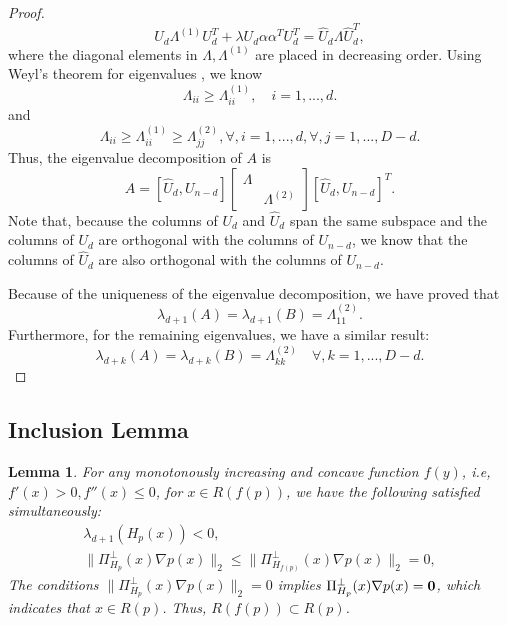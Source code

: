 \documentclass[aos,preprint]{imsart}
\newtheorem{lemma}[theorem]{Lemma}
\theoremstyle{remark}
\begin{document}
\begin{appendix}
\begin{proof}
\[
U_d\Lambda^{(1)} U_d^T+\lambda U_d \alpha \alpha^T U_d^T = \hat{U}_d {\Lambda} \hat{U}_d^T,
\]
where the diagonal elements in $\Lambda, \Lambda^{(1)}$ are placed in decreasing order. Using Weyl's theorem for eigenvalues \cite{horn2012matrix}, we know 
\[
{\Lambda}_{ii}\geq {\Lambda}_{ii}^{(1)}, \quad i=1,..., d.
\] 
and
\[
{\Lambda}_{ii}\geq {\Lambda}_{ii}^{(1)}\geq {\Lambda}_{jj}^{(2)},  \forall, i=1,..., d, \forall, j= 1,...,D-d.
\] 
Thus, the eigenvalue decomposition of $A$ is
\[
A = [\hat{U}_d, U_{n-d}] 
\left[
\begin{array}{cc}
\Lambda & \\
 & \Lambda^{(2)}
\end{array}
\right]
[\hat{U}_d, U_{n-d}]^T.
\]
Note that, because the columns of $U_d$ and $\hat{U}_d$ span the same subspace and the columns of $U_d$ are orthogonal with the columns of $U_{n-d}$, we know that the columns of $\hat{U}_d$ are also orthogonal with the columns of $U_{n-d}$.

Because of the uniqueness of the eigenvalue decomposition, we have proved that 
\[
\lambda_{d+1}(A) = \lambda_{d+1}(B) = \Lambda^{(2)}_{1 1}.
\]
Furthermore, for the remaining eigenvalues, we have a similar result:
\[
\lambda_{d+k}(A) = \lambda_{d+k}(B) = \Lambda^{(2)}_{k k}\quad \forall, k = 1,...,D-d.
\]
\end{proof}
%
\subsection{Inclusion Lemma}
\begin{lemma}{
For any monotonously increasing and concave function $f(y)$, i.e,  $f'(x)>0, f''(x) \leq 0$, for $x\in R({f(p)})$, we have the following satisfied simultaneously:
 \begin{gather*}
 \lambda_{d+1}(H_p(x)) < 0,\\
\|\Pi_{H_p}^\perp(x)\nabla p(x)\|_2 \leq \|\Pi_{H_{f(p)}}^{\perp}(x)\nabla p(x)\|_2=0,
\end{gather*}
The conditions $\|\Pi_{H_p}^\perp(x)\nabla p(x)\|_2  =0$ implies $\Pi_{H_p}^\perp(x)\nabla p(x)=\bf 0$, which indicates that $x\in R(p)$. Thus, $R(f(p)) \subset R(p)$}. %
\label{monotonously theorem} 
\end{lemma}


\end{appendix}
\end{document}
